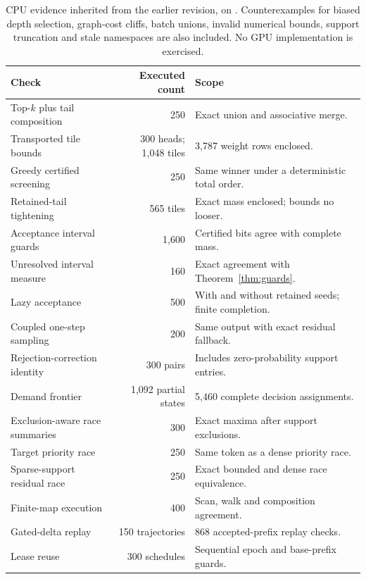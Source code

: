 \begin{table}[htbp]
\small\centering
\begin{tabularx}{\linewidth}{@{}P{5cm}rY@{}}\toprule
Check & Executed count & Scope\\\midrule
Top-$k$ plus tail composition & 250 & Exact union and associative merge.\\
Transported tile bounds & 300 heads; 1,048 tiles & 3,787 weight rows enclosed.\\
Greedy certified screening & 250 & Same winner under a deterministic total order.\\
Retained-tail tightening & 565 tiles & Exact mass enclosed; bounds no looser.\\
Acceptance interval guards & 1,600 & Certified bits agree with complete mass.\\
Unresolved interval measure & 160 & Exact agreement with Theorem~\ref{thm:guards}.\\
Lazy acceptance & 500 & With and without retained seeds; finite completion.\\
Coupled one-step sampling & 200 & Same output with exact residual fallback.\\
Rejection-correction identity & 300 pairs & Includes zero-probability support entries.\\
Demand frontier & 1,092 partial states & 5,460 complete decision assignments.\\
Exclusion-aware race summaries & 300 & Exact maxima after support exclusions.\\
Target priority race & 250 & Same token as a dense priority race.\\
Sparse-support residual race & 250 & Exact bounded and dense race equivalence.\\
Finite-map execution & 400 & Scan, walk and composition agreement.\\
Gated-delta replay & 150 trajectories & 868 accepted-prefix replay checks.\\
Lease reuse & 300 schedules & Sequential epoch and base-prefix guards.\\\bottomrule
\end{tabularx}
\caption{CPU evidence inherited from the earlier revision, on . Counterexamples for biased depth selection, graph-cost cliffs, batch unions, invalid numerical bounds, support truncation and stale namespaces are also included. No GPU implementation is exercised.}
\label{tab:tests}
\end{table}


